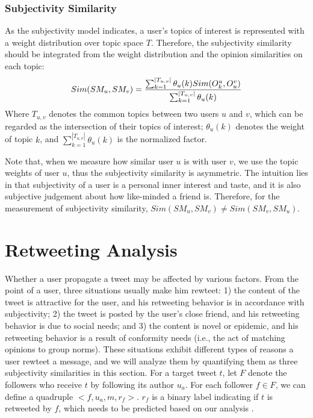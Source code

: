 \documentclass[letterpaper]{article}
\begin{document}
\subsubsection{Subjectivity Similarity}

As the subjectivity model indicates, a user's topics of interest is represented with a weight distribution over topic space $ T $. Therefore, the subjectivity similarity should be integrated from the weight distribution and the opinion similarities on each topic:
\begin{equation}
\label{subsim}
Sim(SM_{u},SM_{v})=\dfrac{\sum_{k=1}^{|T_{u,v}|}\theta_{u}(k)\* Sim(O_{k}^{u},O_{u}^{v})}{\sum_{k=1}^{|T_{u,v}|}\theta_{u}(k)}
\end{equation}
Where $ T_{u,v} $ denotes the common topics between two users $ u $ and $ v $, which can be regarded as the intersection of their topics of interest; $ \theta_{u}(k) $ denotes the weight of topic $ k $, and $ \sum_{k=1}^{|T_{u,v}|}\theta_{u}(k) $ is the normalized factor.

Note that, when we measure how similar user $ u $ is with user $ v $, we use the topic weights of user $ u $, thus the subjectivity similarity is asymmetric. The intuition lies in that subjectivity of a user is a personal inner interest and taste, and it is also subjective judgement about how like-minded a friend is. Therefore, for the measurement of subjectivity similarity, $ Sim(SM_u,SM_v)\neq Sim(SM_v,SM_u)$.

\section{Retweeting Analysis}

Whether a user propagate a tweet may be affected by various factors. 
From the point of a user, three situations usually make him rewteet: 1) the content of the tweet is attractive for the user, and his retweeting behavior is in accordance with subjectivity; 2) the tweet is posted by the user's close friend, and his retweeting behavior is due to social needs; and 3) the content is novel or epidemic, and his retweeting behavior is a result of conformity needs (i.e., the act of matching opinions to group norms\cite{cialdini2004social}). These situations exhibit different types of reasons a user rewteet a message, and   we will analyze them by quantifying them as three subjectivity similarities in this section. 
For a target tweet $ t $, let $ F $ denote the followers who receive $ t $ by following its author $ u_{a} $. 
For each follower $ f \in F $, we can define a quadruple $ <f, u_{a}, m, r_{f}>  $. $ r_{f} $ is a binary label indicating if $ t $ is retweeted by $ f $, which needs to be predicted based on our analysis .
\end{document}
